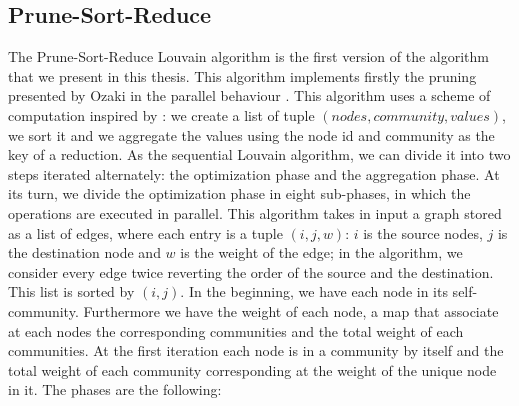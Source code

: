 \subsection{Prune-Sort-Reduce}\label{Prune-Sort-Reduce}
The Prune-Sort-Reduce Louvain algorithm is the first version of the algorithm that we present in this thesis. This algorithm implements firstly the pruning presented by Ozaki in the parallel behaviour \cite{pruning}. This algorithm uses a scheme of computation inspired by \cite{cheong2013hierarchical}: we create a list of tuple $(nodes, community, values)$, we sort it and we aggregate the values using the node id and community as the key of a reduction. As the sequential Louvain algorithm, we can divide it into two steps iterated alternately: the optimization phase and the aggregation phase. 
At its turn, we divide the optimization phase in eight sub-phases, in which the operations are executed in parallel.
This algorithm takes in input a graph stored as a list of edges, where each entry is a tuple $(i,j,w)$: $i$ is the source nodes, $j$ is the destination node and $w$ is the weight of the edge; in the algorithm, we consider every edge twice reverting the order of the source and the destination. This list is sorted by $(i,j)$. In the beginning, we have each node in its self-community.
Furthermore we have the weight of each node, a map that associate at each nodes the corresponding communities and the total weight of each communities. At the first iteration each node is in a community by itself and the total weight of each community corresponding at the weight of the unique node in it. The phases are the following:\\
